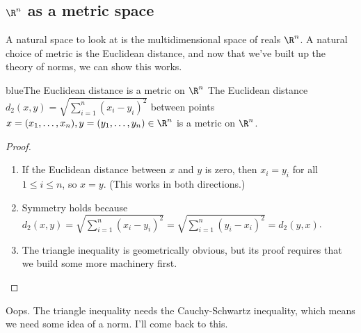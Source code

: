 \documentclass[./analysis.tex]{subfiles}
\begin{document}
    \subsection{$\R^n$ as a metric space}

    A natural space to look at is the multidimensional space of reals $\R^n$. A natural choice of metric is the Euclidean distance, and now that we've built up the theory of norms, we can show this works.

    \begin{mycolorbox}{blue}{The Euclidean distance is a metric on $\R^n$}
        The Euclidean distance $d_2(x, y) = \sqrt{\sum_{i=1}^n (x_i - y_i)^2}$ between points $x = (x_1, \dots, x_n), y = (y_1, \dots, y_n) \in \R^n$ is a metric on $\R^n$.
    \end{mycolorbox}

    \begin{proof}
        \begin{enumerate}
            \item If the Euclidean distance between $x$ and $y$ is zero, then $x_i = y_i$ for all $1 \leq i \leq n$, so $x = y$. (This works in both directions.)
            \item Symmetry holds because $d_2(x, y) = \sqrt{\sum_{i=1}^n (x_i - y_i)^2} = \sqrt{\sum_{i=1}^n (y_i - x_i)^2} = d_2(y, x)$.
            \item The triangle inequality is geometrically obvious, but its proof requires that we build some more machinery first.
        \end{enumerate}
    \end{proof}

    Oops. The triangle inequality needs the Cauchy-Schwartz inequality, which means we need some idea of a norm. I'll come back to this.
\end{document}
